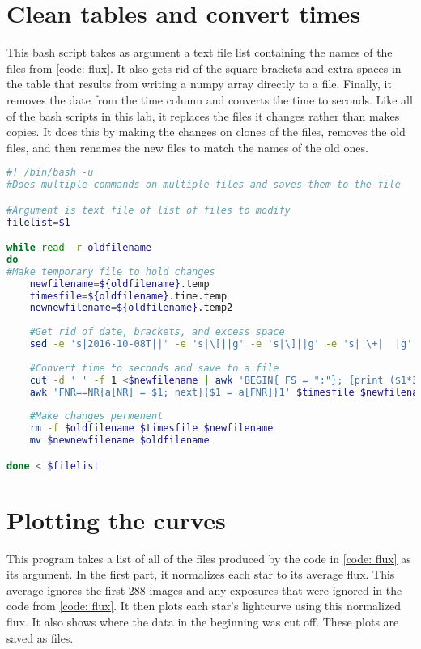 \documentclass{aastex}
\begin{document}
\appendix
\section{Clean tables and convert times} \label{code: mulitcommand}
This bash script takes as argument a text file list containing the names of the files from \ref{code: flux}. It also gets rid of the square brackets and extra spaces in the table that results from writing a numpy array directly to a file. Finally, it removes the date from the time column and converts the time to seconds. Like all of the bash scripts in this lab, it replaces the files it changes rather than makes copies. It does this by making the changes on clones of the files, removes the old files, and then renames the new files to match the names of the old ones.

\begin{lstlisting}[language = bash, caption = Cleans up file and readies for the rest of the lab (YM)]
#! /bin/bash -u
#Does multiple commands on multiple files and saves them to the file

#Argument is text file of list of files to modify
filelist=$1

while read -r oldfilename
do
#Make temporary file to hold changes
	newfilename=${oldfilename}.temp  
	timesfile=${oldfilename}.time.temp
	newnewfilename=${oldfilename}.temp2
	
	#Get rid of date, brackets, and excess space 
	sed -e 's|2016-10-08T||' -e 's|\[||g' -e 's|\]||g' -e 's| \+|  |g' <$oldfilename >$newfilename 
	
	#Convert time to seconds and save to a file
	cut -d ' ' -f 1 <$newfilename | awk 'BEGIN{ FS = ":"}; {print ($1*3600 + $2*60 + $3)}' >$timesfile
	awk 'FNR==NR{a[NR] = $1; next}{$1 = a[FNR]}1' $timesfile $newfilename >$newnewfilename
	
	#Make changes permenent
	rm -f $oldfilename $timesfile $newfilename
	mv $newnewfilename $oldfilename

done < $filelist
\end{lstlisting}


\appendix
\section{Plotting the curves} \label{code: curves}
This program takes a list of all of the files produced by the code in \ref{code: flux} as its argument. In the first part, it normalizes each star to its average flux. This average ignores the first 288 images and any exposures that were ignored in the code from \ref{code: flux}. It then plots each star's lightcurve using this normalized flux. It also shows where the data in the beginning was cut off. These plots are saved as files.
\end{document}
